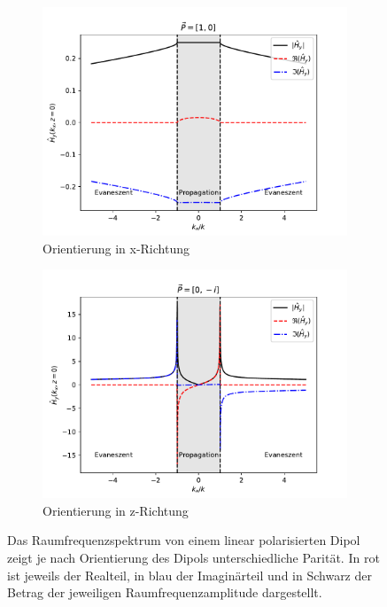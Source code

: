 \documentclass[titlepage]{article}
\begin{document}
		\begin{figure}
			\centering
			\label{fig:spatial_spectrum_zx}
			\begin{subfigure}[h]{0.49\textwidth}
				\centering
				\includegraphics[width=\textwidth]{figures/spatial_spectrum_x.pdf}
				\caption{Orientierung in x-Richtung}
				\label{fig:spatial_spectrum_x}
			\end{subfigure}		
			\begin{subfigure}[h]{0.5\textwidth}
				\centering
				\includegraphics[width=\textwidth]{figures/spatial_spectrum_z.pdf}
				\caption{Orientierung in z-Richtung}
				\label{fig:spatial_spectrum_z}
			\end{subfigure}		
			\caption{Das Raumfrequenzspektrum von  einem linear polarisierten Dipol zeigt je nach Orientierung des Dipols unterschiedliche Parität. In rot ist jeweils der Realteil, in blau der Imaginärteil und in Schwarz der Betrag der jeweiligen Raumfrequenzamplitude dargestellt.}		
		\end{figure}
\end{document}
